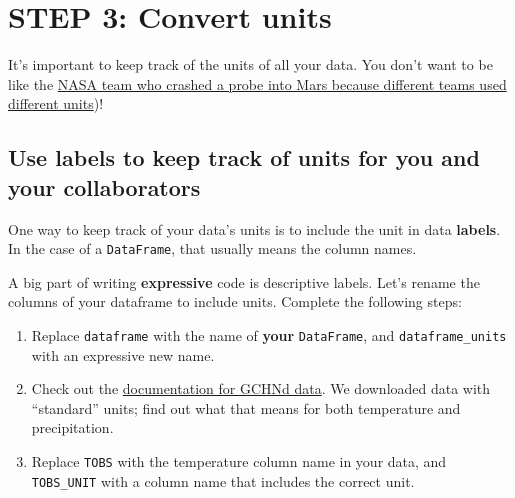 \documentclass[
  letterpaper,
  DIV=11,
  numbers=noendperiod,
  oneside]{scrreprt}
\providecommand{\tightlist}{%
  \setlength{\itemsep}{0pt}\setlength{\parskip}{0pt}}
\begin{document}
\chapter{STEP 3: Convert units}\label{step-3-convert-units-1}

It's important to keep track of the units of all your data. You don't
want to be like the
\href{https://www.latimes.com/archives/la-xpm-1999-oct-01-mn-17288-story.html}{NASA
team who crashed a probe into Mars because different teams used
different units})!

\section{Use labels to keep track of units for you and your
collaborators}\label{use-labels-to-keep-track-of-units-for-you-and-your-collaborators-1}

One way to keep track of your data's units is to include the unit in
data \textbf{labels}. In the case of a \texttt{DataFrame}, that usually
means the column names.

\begin{tcolorbox}[enhanced jigsaw, colbacktitle=quarto-callout-color!10!white, opacityback=0, bottomtitle=1mm, toptitle=1mm, bottomrule=.15mm, left=2mm, colframe=quarto-callout-color-frame, leftrule=.75mm, opacitybacktitle=0.6, colback=white, rightrule=.15mm, toprule=.15mm, breakable, titlerule=0mm, title=\textcolor{quarto-callout-color}{\faInfo}\hspace{0.5em}{Try It: Add units to your column name}, coltitle=black, arc=.35mm]

A big part of writing \textbf{expressive} code is descriptive labels.
Let's rename the columns of your dataframe to include units. Complete
the following steps:

\begin{enumerate}
\def\labelenumi{\arabic{enumi}.}
\tightlist
\item
  Replace \texttt{dataframe} with the name of \textbf{your}
  \texttt{DataFrame}, and \texttt{dataframe\_units} with an expressive
  new name.
\item
  Check out the
  \href{https://www.ncei.noaa.gov/data/global-historical-climatology-network-daily/doc/GHCND_documentation.pdf}{documentation
  for GCHNd data}. We downloaded data with ``standard'' units; find out
  what that means for both temperature and precipitation.
\item
  Replace \texttt{\textquotesingle{}TOBS\textquotesingle{}} with the
  temperature column name in your data, and
  \texttt{\textquotesingle{}TOBS\_UNIT\textquotesingle{}} with a column
  name that includes the correct unit.
\end{enumerate}

\end{tcolorbox}
\end{document}
